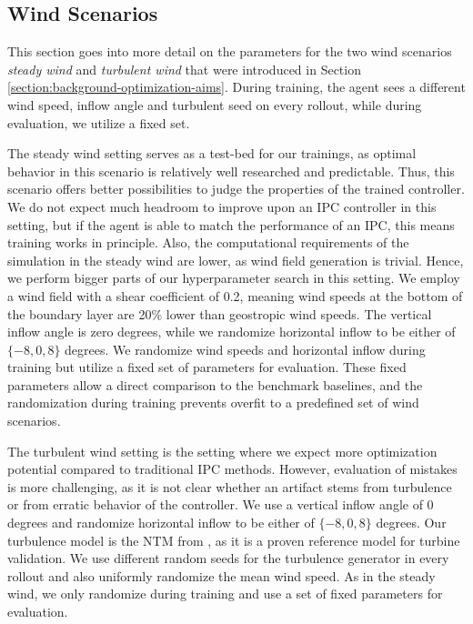 \subsection{Wind Scenarios}

\begin{summary}
This section goes into more detail on the parameters for the two wind scenarios \textit{steady wind} and \textit{turbulent wind} that were introduced in Section \ref{section:background-optimization-aims}. During training, the agent sees a different wind speed, inflow angle and turbulent seed on every rollout, while during evaluation, we utilize a fixed set.
\end{summary}

The steady wind setting serves as a test-bed for our trainings, as optimal behavior in this scenario is relatively well researched and predictable. Thus, this scenario offers better possibilities to judge the properties of the trained controller. We do not expect much headroom to improve upon an \ac{IPC} controller in this setting, but if the agent is able to match the performance of an \ac{IPC}, this means training works in principle. Also, the computational requirements of the simulation in the steady wind are lower, as wind field generation is trivial. Hence, we perform bigger parts of our hyperparameter search in this setting. We employ a wind field with a shear coefficient of 0.2, meaning wind speeds at the bottom of the boundary layer are 20\% lower than geostropic wind speeds. The vertical inflow angle is zero degrees, while we randomize horizontal inflow to be either of $\{-8, 0, 8\}$ degrees. We randomize wind speeds and horizontal inflow during training but utilize a fixed set of parameters for evaluation. These fixed parameters allow a direct comparison to the benchmark baselines, and the randomization during training prevents overfit to a predefined set of wind scenarios.

The turbulent wind setting is the setting where we expect more optimization potential compared to traditional IPC methods. However, evaluation of mistakes is more challenging, as it is not clear whether an artifact stems from turbulence or from erratic behavior of the controller. We use a vertical inflow angle of 0 degrees and randomize horizontal inflow to be either of $\{-8, 0, 8\}$ degrees. Our turbulence model is the \acf{NTM} from \citet{internationalelectrotechnicalcommissionIEC61400120192019}, as it is a proven reference model for turbine validation. We use different random seeds for the turbulence generator in every rollout and also uniformly randomize the mean wind speed. As in the steady wind, we only randomize during training and use a set of fixed parameters for evaluation.

